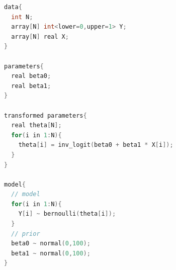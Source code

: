 \begin{lstlisting}[language=c++,label={stan::24_02},caption={ロジスティック回帰分析のコード}]
data{
  int N;
  array[N] int<lower=0,upper=1> Y;
  array[N] real X;
}

parameters{
  real beta0;
  real beta1;
}

transformed parameters{
  real theta[N];
  for(i in 1:N){
    theta[i] = inv_logit(beta0 + beta1 * X[i]);
  }
}

model{
  // model
  for(i in 1:N){
    Y[i] ~ bernoulli(theta[i]);
  }
  // prior
  beta0 ~ normal(0,100);
  beta1 ~ normal(0,100);
}

\end{lstlisting}
